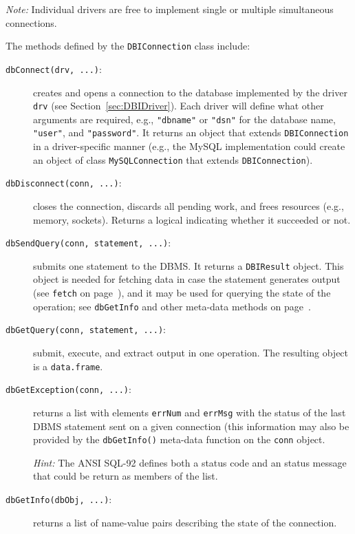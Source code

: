 \documentclass[graphics,times,psfig,dvips,hyper]{article}
\newcommand{\sfun}[1]{\mbox{\tt #1()}}  %
\newcommand{\sobj}[1]{\mbox{\tt #1}}    %
\newcommand{\sclass}[1]{\mbox{\tt #1}}  %
\newcommand{\smethod}[1]{\mbox{\tt #1}} %
\begin{document}
\emph{Note:} Individual drivers are free to implement single or
multiple simultaneous connections.

The methods defined by the \sclass{DBIConnection} class include:
\begin{description}
\item[\smethod{dbConnect(drv, ...)}:]\label{meth:dbConnect}
  creates and opens a connection to the database implemented by the
  driver \sobj{drv} (see Section~\ref{sec:DBIDriver}).  Each driver will
  define what other arguments are required, e.g., \sobj{"dbname"} or
  \sobj{"dsn"} for the database name, \sobj{"user"}, and \sobj{"password"}.
  It returns an object that extends \sclass{DBIConnection} in a
  driver-specific manner (e.g., the MySQL implementation could
  create an object of class \sclass{MySQLConnection} that extends 
  \sclass{DBIConnection}).

\item[\smethod{dbDisconnect(conn, ...)}:]
  closes the connection, discards all pending work, and frees
  resources (e.g., memory, sockets).  Returns a logical indicating
  whether it succeeded or not.

\item[\smethod{dbSendQuery(conn, statement, ...)}:]
  submits one statement to the DBMS.  It returns a \sclass{DBIResult}
  object. This object is needed for fetching data in case
  the statement generates output (see \smethod{fetch} on
  page~\pageref{meth:fetch}), and it may be used for querying the
  state of the operation; see \smethod{dbGetInfo} and other 
  meta-data methods on page~\pageref{meth:res-others}.

\item[\smethod{dbGetQuery(conn, statement, ...)}:]
  submit, execute, and extract output in one operation.
  The resulting object is a \sclass{data.frame}.

\item[\smethod{dbGetException(conn, ...)}:]
  returns a list with elements \sobj{errNum} and \sobj{errMsg}
  with the status of the last DBMS statement sent on a given
  connection (this information may also be provided by the
  \sfun{dbGetInfo} meta-data function on the \sobj{conn} object.

  \emph{Hint:} The ANSI SQL-92 defines both a status code and an
  status message that could be return as members of the list.

\item[\smethod{dbGetInfo(dbObj, ...)}:]
  returns a list of name-value pairs describing the state of the
  connection.  


\end{description}
\end{document}
